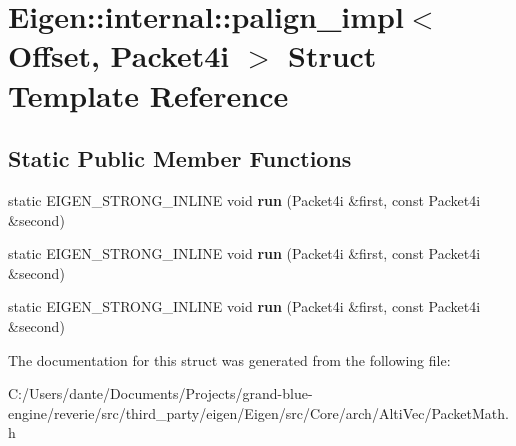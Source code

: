 \hypertarget{struct_eigen_1_1internal_1_1palign__impl_3_01_offset_00_01_packet4i_01_4}{}\section{Eigen\+::internal\+::palign\+\_\+impl$<$ Offset, Packet4i $>$ Struct Template Reference}
\label{struct_eigen_1_1internal_1_1palign__impl_3_01_offset_00_01_packet4i_01_4}
\subsection*{Static Public Member Functions}
\begin{DoxyCompactItemize}
\item 
\mbox{\label{struct_eigen_1_1internal_1_1palign__impl_3_01_offset_00_01_packet4i_01_4_a85d58b7eca3be350b89edc175e048335}} 
static E\+I\+G\+E\+N\+\_\+\+S\+T\+R\+O\+N\+G\+\_\+\+I\+N\+L\+I\+NE void {\bfseries run} (Packet4i \&first, const Packet4i \&second)
\item 
\mbox{\label{struct_eigen_1_1internal_1_1palign__impl_3_01_offset_00_01_packet4i_01_4_a85d58b7eca3be350b89edc175e048335}} 
static E\+I\+G\+E\+N\+\_\+\+S\+T\+R\+O\+N\+G\+\_\+\+I\+N\+L\+I\+NE void {\bfseries run} (Packet4i \&first, const Packet4i \&second)
\item 
\mbox{\label{struct_eigen_1_1internal_1_1palign__impl_3_01_offset_00_01_packet4i_01_4_a85d58b7eca3be350b89edc175e048335}} 
static E\+I\+G\+E\+N\+\_\+\+S\+T\+R\+O\+N\+G\+\_\+\+I\+N\+L\+I\+NE void {\bfseries run} (Packet4i \&first, const Packet4i \&second)
\end{DoxyCompactItemize}


The documentation for this struct was generated from the following file\+:\begin{DoxyCompactItemize}
\item 
C\+:/\+Users/dante/\+Documents/\+Projects/grand-\/blue-\/engine/reverie/src/third\+\_\+party/eigen/\+Eigen/src/\+Core/arch/\+Alti\+Vec/Packet\+Math.\+h\end{DoxyCompactItemize}
